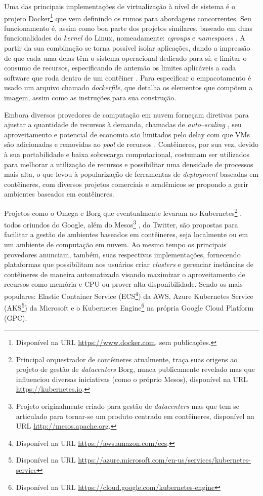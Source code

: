 \documentclass[english,brazilian]{UNISINOSmonografia} %
\begin{document}
Uma das principais implementações de virtualização à nível de sistema é o projeto Docker\footnote{
	Disponível na URL \url{https://www.docker.com}, sem publicações.
} que vem definindo os rumos para abordagens concorrentes.
Seu funcionamento é, assim como boa parte dos projetos similares, baseado em duas funcionalidades do \textit{kernel} do Linux, nomeadamente: \textit{cgroups} e \textit{namespaces} \cite{Pahl2015a}.
A partir da sua combinação se torna possível isolar aplicações, dando a impressão de que cada uma delas têm o sistema operacional dedicado para sí; e limitar o consumo de recursos, especificando de antemão os limites aplicáveis a cada software que roda dentro de um contêiner \cite{Tosatto2015}.
Para especificar o empacotamento é usado um arquivo chamado \textit{dockerfile}, que detalha os elementos que compõem a imagem, assim como as instruções para sua construção.



Embora diversos provedores de computação em nuvem forneçam diretivas para ajustar a quantidade de recursos à demanda, chamadas de \textit{auto--scaling} \cite{Mao2011}, seu aproveitamento e potencial de economia são limitados pelo delay com que VMs são adicionadas e removidas ao \textit{pool} de recursos \cite{Shankar2018}.
Contêineres, por sua vez, devido à sua portabilidade e baixa sobrecarga computacional, costumam ser utilizados para melhorar a utilização de recursos e possibilitar uma densidade de processos mais alta, o que levou à popularização de ferramentas de \textit{deployment} baseadas em contêineres, com diversos projetos comerciais e acadêmicos se propondo a gerir ambientes baseados em contêineres.



Projetos como o Omega \cite{Schwarzkopf2013} e Borg \cite{Verma2015} que eventualmente levaram ao Kubernetes\footnote{
	Principal orquestrador de contêineres atualmente, traça suas origens ao projeto de gestão de \textit{datacenters} Borg, nunca publicamente revelado mas que influenciou diversas iniciativas (como o próprio Mesos), disponível na URL \url{https://kubernetes.io}.
} \cite{Burns2016}, todos oriundos do Google, além do Mesos\footnote{
	Projeto originalmente criado para gestão de \textit{datacenters} mas que tem se articulado para tornar-se um produto centrado em contêineres, disponível na URL \url{http://mesos.apache.org}.
} \cite{Hindman2011}, do Twitter, são propostas para facilitar a gestão de ambientes baseados em contêineres, seja localmente ou em um ambiente de computação em nuvem.
Ao mesmo tempo os principais provedores anunciam, também, suas respectivas implementações, fornecendo plataformas que possibilitam aos usuários criar \textit{clusters} e gerenciar instâncias de contêineres de maneira automatizada visando maximizar o aproveitamento de recursos como memória e CPU ou prover alta disponibilidade. Sendo os mais populares: Elastic Container Service (ECS\footnote{
	Disponível na URL \url{https://aws.amazon.com/ecs}.
}) da AWS, Azure Kubernetes Service (AKS\footnote{
	Disponível na URL \url{https://azure.microsoft.com/en-us/services/kubernetes-service}
}) da Microsoft e o Kubernetes Engine\footnote{
	Disponível na URL \url{https://cloud.google.com/kubernetes-engine}
} na própria Google Cloud Platform (GPC).
\end{document}

